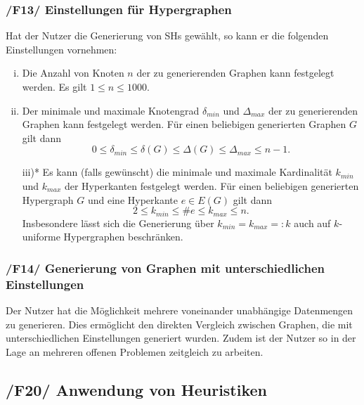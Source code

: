 \documentclass{article}
\begin{document}
	\subsubsection*{/F13/ Einstellungen für Hypergraphen} \label{f13} 
	Hat der Nutzer die Generierung von SHs gewählt, so kann er die folgenden Einstellungen vornehmen:
	\begin{enumerate}[i)]
		\item{Die Anzahl von Knoten $n$ der zu generierenden Graphen kann festgelegt werden. Es gilt $1 \leq n \leq 1000$.}
		\item{Der minimale und maximale Knotengrad $\delta_{min}$ und $\Delta_{max}$ der zu generierenden Graphen kann festgelegt werden. Für einen beliebigen generierten Graphen $G$ gilt dann $$0 \leq \delta_{min} \leq \delta(G) \leq \Delta(G) \leq \Delta_{max} \leq n-1.$$}
		\item[iii)*]{Es kann (falls gewünscht) die minimale und maximale Kardinalität $k_{min}$ und $k_{max}$ der Hyperkanten festgelegt werden. Für einen beliebigen generierten Hypergraph $G$ und eine Hyperkante $e \in E(G)$ gilt dann $$2 \leq k_{min} \leq \# e \leq k_{max} \leq n.$$ Insbesondere lässt sich die Generierung über $k_{min} = k_{max} =: k$ auch auf $k$-uniforme Hypergraphen beschränken.}
	\end{enumerate}
	
	\subsubsection*{/F14/ Generierung von Graphen mit unterschiedlichen Einstellungen} \label{f14} 
	Der Nutzer hat die Möglichkeit mehrere voneinander unabhängige Datenmengen zu generieren. Dies ermöglicht den direkten Vergleich zwischen Graphen, die mit unterschiedlichen Einstellungen generiert wurden. Zudem ist der Nutzer so in der Lage an mehreren offenen Problemen zeitgleich zu arbeiten.
	
	
	\newpage
	
	\subsection*{/F20/ Anwendung von Heuristiken} \label{f20} 
	
\end{document}
